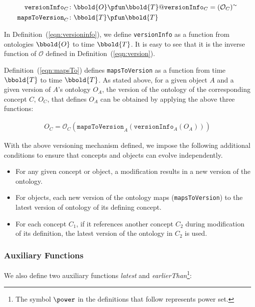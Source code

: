 \documentclass[preprint,12pt]{elsarticle}
\begin{document}
\begin{align}
\mathtt{versionInfo}_C &\colon \bbold{O}\pfun \bbold{T} @ \mathtt{versionInfo}_C = (\mathcal{O}_C)^{\sim}\label{eqn:versioninfo}\\
\mathtt{mapsToVersion}_C &\colon \bbold{T}\pfun \bbold{T}\label{eqn:mapsTo}
\end{align}

In Definition~(\ref{eqn:versioninfo}), we define \texttt{versionInfo} as a function from ontologies $\bbold{O}$ to time $\bbold{T}$. It is easy to see that it is the inverse function of $\mathcal{O}$ defined in Definition~(\ref{eqn:version}). %

Definition~(\ref{eqn:mapsTo}) defines \texttt{mapsToVersion} as a function from time $\bbold{T}$ to time $\bbold{T}$. As stated above, for a given object $A$ and a given version of $A$'s ontology $O_A$, the version of the ontology of the corresponding concept $C$, $O_C$, that defines $O_A$ can be obtained by applying the above three functions: 

\begin{align}
O_C = \mathcal{O}_C(\mathtt{mapsToVersion}_A(\mathtt{versionInfo}_A(O_A))) 
\end{align}

With the above versioning mechanism defined, we impose the following additional conditions to ensure that concepts and objects can evolve independently.
\begin{itemize}
\item For any given concept or object, a modification results in a new version of the ontology.
\item For objects, each new version of the ontology maps (\texttt{mapsToVersion}) to the latest version of ontology of its defining concept.
\item For each concept $C_1$,  if it references another concept $C_2$ during modification of its definition, the latest version of the ontology in $C_2$ is used.
\end{itemize}

\subsubsection{Auxiliary Functions}
We also define two auxiliary functions \emph{latest} and \emph{earlierThan}\footnote{The symbol $\power$ in the definitions that follow represents power set.}:
\end{document}
